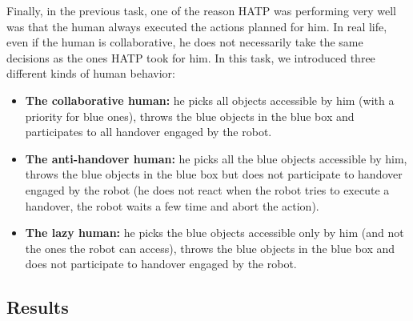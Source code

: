 \documentclass[english,a4paper,11pt,twoside]{StyleThese}
\begin{document}
Finally, in the previous task, one of the reason HATP was performing very well was that the human always executed the actions planned for him. In real life, even if the human is collaborative, he does not necessarily take the same decisions as the ones HATP took for him. In this task, we introduced three different kinds of human behavior:
\begin{itemize}
\item \textbf{The collaborative human:} he picks all objects accessible by him (with a priority for blue ones), throws the blue objects in the blue box and participates to all handover engaged by the robot.
\item \textbf{The anti-handover human:} he picks all the blue objects accessible by him, throws the blue objects in the blue box but does not participate to handover engaged by the robot (he does not react when the robot tries to execute a handover, the robot waits a few time and abort the action).
\item \textbf{The lazy human:} he picks the blue objects accessible only by him (and not the ones the robot can access), throws the blue objects in the blue box and does not participate to handover engaged by the robot.
\end{itemize}

\subsection{Results}
\end{document}
